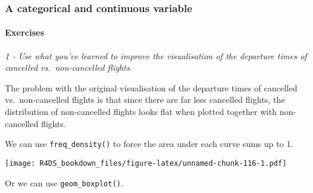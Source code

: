 \documentclass[]{article}
\newenvironment{Shaded}{\begin{snugshade}}{\end{snugshade}}
\newcommand{\KeywordTok}[1]{\textcolor[rgb]{0.13,0.29,0.53}{\textbf{#1}}}
\newcommand{\DataTypeTok}[1]{\textcolor[rgb]{0.13,0.29,0.53}{#1}}
\newcommand{\DecValTok}[1]{\textcolor[rgb]{0.00,0.00,0.81}{#1}}
\newcommand{\StringTok}[1]{\textcolor[rgb]{0.31,0.60,0.02}{#1}}
\newcommand{\OperatorTok}[1]{\textcolor[rgb]{0.81,0.36,0.00}{\textbf{#1}}}
\newcommand{\NormalTok}[1]{#1}
\let\oldparagraph\paragraph
\renewcommand{\paragraph}[1]{\oldparagraph{#1}\mbox{}}
\theoremstyle{definition}
\theoremstyle{definition}
\theoremstyle{definition}
\theoremstyle{remark}
\begin{document}
\subsubsection{A categorical and continuous
variable}\label{a-categorical-and-continuous-variable}

\paragraph{Exercises}\label{exercises-15}

\emph{1 - Use what you've learned to improve the visualisation of the
departure times of cancelled vs.~non-cancelled flights.}

The problem with the original visualisation of the departure times of
cancelled vs.~non-cancelled flights is that since there are far less
cancelled flights, the distribution of non-cancelled flights looks flat
when plotted together with non-cancelled flights.

We can use \texttt{freq\_density()} to force the area under each curve
sums up to 1.

\begin{Shaded}
\end{Shaded}

\texttt{[image: R4DS\_bookdown\_files/figure-latex/unnamed-chunk-116-1.pdf]}

Or we can use \texttt{geom\_boxplot()}.
\end{document}
